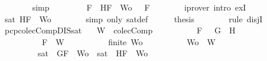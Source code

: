 \begin{isabellebody}
\ \ \ \ \ \ \isamarkupfalse%
\ simp\isanewline
\ \ \ \ \isamarkupfalse%
\ \isamarkupfalse%
\ {\isachardoublequoteopen}{\isasymexists}{\isasymA}{\isachardot}\ {\isasymforall}F\ {\isasymin}\ {\isacharparenleft}{\isacharbraceleft}H{\isacharcomma}F{\isacharbraceright}\ {\isasymunion}\ Wo{\isacharparenright}{\isachardot}\ {\isasymA}\ {\isasymTurnstile}\ F{\isachardoublequoteclose}\isanewline
\ \ \ \ \ \ \isamarkupfalse%
\ {\isacharparenleft}iprover\ intro{\isacharcolon}\ exI{\isacharparenright}\isanewline
\ \ \ \ \isamarkupfalse%
\ \isamarkupfalse%
\ {\isachardoublequoteopen}sat\ {\isacharparenleft}{\isacharbraceleft}H{\isacharcomma}F{\isacharbraceright}\ {\isasymunion}\ Wo{\isacharparenright}{\isachardoublequoteclose}\isanewline
\ \ \ \ \ \ \isamarkupfalse%
\ {\isacharparenleft}simp\ only{\isacharcolon}\ sat{\isacharunderscore}def{\isacharparenright}\isanewline
\ \ \ \ \isamarkupfalse%
\ {\isacharquery}thesis\isanewline
\ \ \ \ \ \ \isamarkupfalse%
\ {\isacharparenleft}rule\ disjI{}{\isacharparenright}\isanewline
\ \ \isamarkupfalse%
\isanewline
{}\isamarkupfalse%
%
\endisatagproof
{\isafoldproof}%
%
\isadelimproof
\isanewline
%
\endisadelimproof
\isanewline
{}\isamarkupfalse%
\ pcp{\isacharunderscore}colecComp{\isacharunderscore}DIS{\isacharunderscore}sat{}{\isacharcolon}\isanewline
\ \ \ {\isachardoublequoteopen}W\ {\isasymin}\ colecComp{\isachardoublequoteclose}\isanewline
\ \ \ \ \ \ \ \ \ \ {\isachardoublequoteopen}F\ {\isacharequal}\ \isactrlbold {\isasymnot}\ {\isacharparenleft}G\ \isactrlbold {\isasymand}\ H{\isacharparenright}{\isachardoublequoteclose}\isanewline
\ \ \ \ \ \ \ \ \ \ {\isachardoublequoteopen}F\ {\isasymin}\ W{\isachardoublequoteclose}\isanewline
\ \ \ \ \ \ \ \ \ \ {\isachardoublequoteopen}finite\ Wo{\isachardoublequoteclose}\isanewline
\ \ \ \ \ \ \ \ \ \ {\isachardoublequoteopen}Wo\ {\isasymsubseteq}\ W{\isachardoublequoteclose}\isanewline
\ \ \ \ \ \ \ \ \ {\isachardoublequoteopen}sat\ {\isacharparenleft}{\isacharbraceleft}\isactrlbold {\isasymnot}\ G{\isacharcomma}F{\isacharbraceright}\ {\isasymunion}\ Wo{\isacharparenright}\ {\isasymor}\ sat\ {\isacharparenleft}{\isacharbraceleft}\isactrlbold {\isasymnot}\ H{\isacharcomma}F{\isacharbraceright}\ {\isasymunion}\ Wo{\isacharparenright}{\isachardoublequoteclose}\isanewline
%
\isadelimproof
%
\endisadelimproof
%
\isatagproof
{}\isamarkupfalse%

\end{isabellebody}
